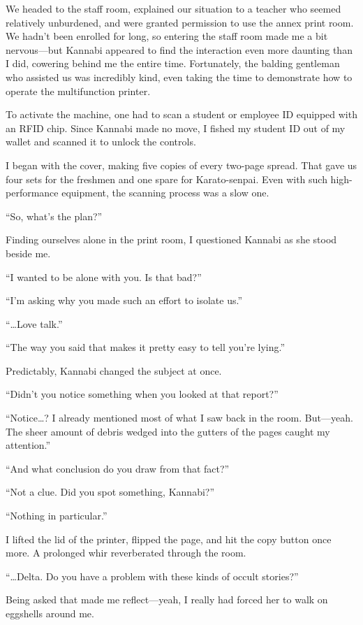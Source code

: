 \documentclass[
    a4paper,
    12pt,
    twoside,
    openany,
    UTF8,
    fontset=windows
]{ctexbook}
\begin{document}
We headed to the staff room, explained our situation to a teacher who seemed relatively unburdened, and were granted permission to use the annex print room. We hadn't been enrolled for long, so entering the staff room made me a bit nervous---but Kannabi appeared to find the interaction even more daunting than I did, cowering behind me the entire time. Fortunately, the balding gentleman who assisted us was incredibly kind, even taking the time to demonstrate how to operate the multifunction printer.

To activate the machine, one had to scan a student or employee ID equipped with an RFID chip. Since Kannabi made no move, I fished my student ID out of my wallet and scanned it to unlock the controls.

I began with the cover, making five copies of every two-page spread. That gave us four sets for the freshmen and one spare for Karato-senpai. Even with such high-performance equipment, the scanning process was a slow one.

``So, what's the plan?''

Finding ourselves alone in the print room, I questioned Kannabi as she stood beside me.

``I wanted to be alone with you. Is that bad?''

``I'm asking why you made such an effort to isolate us.''

``\dots Love talk.''

``The way you said that makes it pretty easy to tell you're lying.''

Predictably, Kannabi changed the subject at once.

``Didn't you notice something when you looked at that report?''

``Notice\dots? I already mentioned most of what I saw back in the room. But---yeah. The sheer amount of debris wedged into the gutters of the pages caught my attention.''

``And what conclusion do you draw from that fact?''

``Not a clue. Did you spot something, Kannabi?''

``Nothing in particular.''

I lifted the lid of the printer, flipped the page, and hit the copy button once more. A prolonged whir reverberated through the room.

``\dots Delta. Do you have a problem with these kinds of occult stories?''

Being asked that made me reflect---yeah, I really had forced her to walk on eggshells around me.
\end{document}
